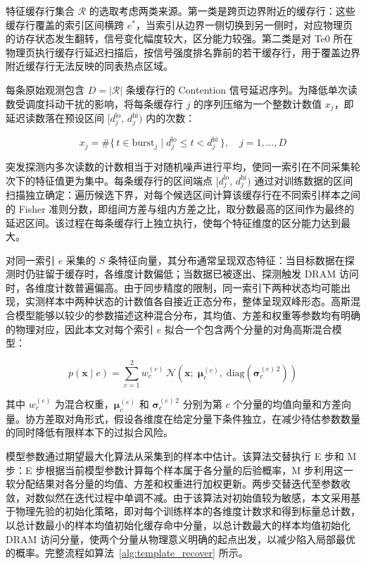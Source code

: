 特征缓存行集合 $\mathcal{R}$ 的选取考虑两类来源。第一类是跨页边界附近的缓存行：这些缓存行覆盖的索引区间横跨 $e^*$，当索引从边界一侧切换到另一侧时，对应物理页的访存状态发生翻转，信号变化幅度较大，区分能力较强。第二类是对 Te0 所在物理页执行缓存行延迟扫描后，按信号强度排名靠前的若干缓存行，用于覆盖边界附近缓存行无法反映的同表热点区域。

每条原始观测包含 $D = |\mathcal{R}|$ 条缓存行的 Contention 信号延迟序列。为降低单次读数受调度抖动干扰的影响，将每条缓存行 $j$ 的序列压缩为一个整数计数值 $x_j$，即延迟读数落在预设区间 $[d_j^{\mathrm{lo}},\, d_j^{\mathrm{hi}})$ 内的次数：

\begin{equation}
  x_j = \#\bigl\{\, t \in \text{burst}_j \;\big|\; d_j^{\mathrm{lo}} \leq t < d_j^{\mathrm{hi}} \,\bigr\}, \quad j = 1, \ldots, D
  \label{eq:feature_component}
\end{equation}

突发探测内多次读数的计数相当于对随机噪声进行平均，使同一索引在不同采集轮次下的特征值更为集中。每条缓存行的区间端点 $[d_j^{\mathrm{lo}},\, d_j^{\mathrm{hi}})$ 通过对训练数据的区间扫描独立确定：遍历候选下界，对每个候选区间计算该缓存行在不同索引样本之间的 Fisher 准则分数，即组间方差与组内方差之比，取分数最高的区间作为最终的延迟区间。该过程在每条缓存行上独立执行，使每个特征维度的区分能力达到最大。

对同一索引 $e$ 采集的 $S$ 条特征向量，其分布通常呈现双态特征：当目标数据在探测时仍驻留于缓存时，各维度计数偏低；当数据已被逐出、探测触发 DRAM 访问时，各维度计数普遍偏高。由于同步精度的限制，同一索引下两种状态均可能出现，实测样本中两种状态的计数值各自接近正态分布，整体呈现双峰形态。高斯混合模型能够以较少的参数描述这种混合分布，其均值、方差和权重等参数均有明确的物理对应，因此本文对每个索引 $e$ 拟合一个包含两个分量的对角高斯混合模型：

\begin{equation}
  p(\mathbf{x} \mid e) = \sum_{c=1}^{2} w_c^{(e)}\,
  \mathcal{N}\!\left(\mathbf{x};\; \boldsymbol{\mu}_c^{(e)},\; \mathrm{diag}\!\left(\boldsymbol{\sigma}_c^{(e)\,2}\right)\right)
  \label{eq:gmm_model}
\end{equation}

其中 $w_c^{(e)}$ 为混合权重，$\boldsymbol{\mu}_c^{(e)}$ 和 $\boldsymbol{\sigma}_c^{(e)\,2}$ 分别为第 $c$ 个分量的均值向量和方差向量。协方差取对角形式，假设各维度在给定分量下条件独立，在减少待估参数数量的同时降低有限样本下的过拟合风险。

模型参数通过期望最大化算法从采集到的样本中估计。该算法交替执行 E 步和 M 步：E 步根据当前模型参数计算每个样本属于各分量的后验概率，M 步利用这一软分配结果对各分量的均值、方差和权重进行加权更新。两步交替迭代至参数收敛，对数似然在迭代过程中单调不减。由于该算法对初始值较为敏感，本文采用基于物理先验的初始化策略，即对每个训练样本的各维度计数求和得到标量总计数，以总计数最小的样本均值初始化缓存命中分量，以总计数最大的样本均值初始化 DRAM 访问分量，使两个分量从物理意义明确的起点出发，以减少陷入局部最优的概率。完整流程如算法~\ref{alg:template_recover} 所示。

